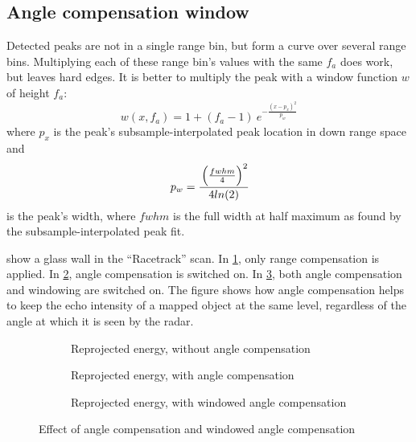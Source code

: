 \subsection{Angle compensation window}\label{angle-compensation-window}

Detected peaks are not in a single range bin, but form a curve over
several range bins. Multiplying each of these range bin's values with
the same \(f_a\) does work, but leaves hard edges. It is better to
multiply the peak with a window function $w$ of height \(f_a\):
\begin{equation}
w(x,f_a) = 1 + (f_a - 1) ~e ^ { -\frac{ \left( {x - p_x} \right) ^ 2 } {p_w} }
\end{equation}
where \(p_x\) is the peak's subsample-interpolated peak location in
down range space and
\begin{equation}
p_w = \cfrac{
\left( \frac{fwhm}{4}  \right) ^2
}{
4 ln(2)}
\end{equation}
is the peak's width, where \(fwhm\) is the full width at half maximum as
found by the subsample-interpolated peak fit.

 show a glass wall in the ``Racetrack'' scan. In \cref{fig:fig_angle_compensation_comparison_1}, only range compensation is applied. In \cref{fig:fig_angle_compensation_comparison_2},
angle compensation is switched on. In \cref{fig:fig_angle_compensation_comparison_3}, both angle
compensation and windowing are switched on. The
figure shows how angle compensation helps to keep the echo intensity of
a mapped object at the same level, regardless of the angle at which it
is seen by the radar.

\begin{figure}[htbp]
    \centering
    \begin{subfigure}{\textwidth}
        \centering
        \def\svgscale{0.8} \small
        
        \caption{Reprojected energy, without angle compensation}
        \label{fig:fig_angle_compensation_comparison_1}
        \bigskip
    \end{subfigure}
    \begin{subfigure}{\textwidth}
        \centering
        \def\svgscale{0.8} \small
        
        \caption{Reprojected energy, with angle compensation}
        \label{fig:fig_angle_compensation_comparison_2}
        \bigskip
    \end{subfigure}
    \begin{subfigure}{\textwidth}
        \centering
        \def\svgscale{0.8} \small
        
        \caption{Reprojected energy, with windowed angle compensation}
        \label{fig:fig_angle_compensation_comparison_3}
        \bigskip
    \end{subfigure}
    \caption{Effect of angle compensation and windowed angle compensation}
    \label{fig:fig_angle_compensation_comparison}
\end{figure}
